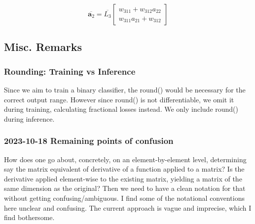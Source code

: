 \documentclass{article}
\begin{document}
\[\overline{\bm{a}_2} = \overline{L_3} \begin{bmatrix}w_{311} + w_{312}a_{22}\\ w_{311}a_{21} + w_{312}\end{bmatrix}\]


\subsection{Misc. Remarks}
\subsubsection{Rounding: Training vs Inference} Since we aim to train a binary classifier, the round() would be necessary for the correct output range. However since round() is not differentiable, we omit it during training, calculating fractional losses instead. We only include round() during inference.
\subsubsection{2023-10-18 Remaining points of confusion} How does one go about, concretely, on an element-by-element
level, determining say the matrix equivalent of derivative of a function applied to a matrix? 
Is the derivative applied element-wise to the existing matrix, yielding a matrix of the same dimension as the original?
Then we need to have a clean notation for that without getting confusing/ambiguous. I find some of the notational
conventions here unclear and confusing. The current approach is vague and imprecise, which I find bothersome.
\end{document}
